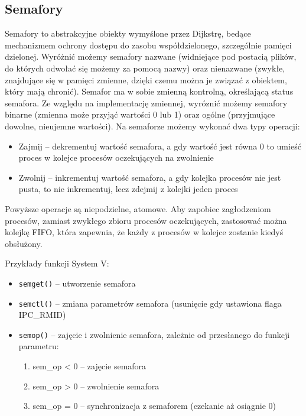 \subsection{Semafory}

Semafory to abstrakcyjne obiekty wymyślone przez Dijkstrę, bedące mechanizmem ochrony dostępu do zasobu współdzielonego, szczególnie pamięci dzielonej. Wyróżnić możemy semafory nazwane (widniejące pod postacią plików, do których odwołać się możemy za pomocą nazwy) oraz nienazwane (zwykłe, znajdujące się w pamięci zmienne, dzięki czemu można je związać z obiektem, który mają chronić). Semafor ma w sobie zmienną kontrolną, określającą status semafora. Ze względu na implementację zmiennej, wyróznić możemy semafory binarne (zmienna może przyjąć wartości 0 lub 1) oraz ogólne (przyjmujące dowolne, nieujemne wartości). Na semaforze możemy wykonać dwa typy operacji:
\begin{itemize}
	\item Zajmij -- dekrementuj wartość semafora, a gdy wartość jest równa 0 to umieść proces w kolejce procesów oczekujących na zwolnienie
    \item Zwolnij -- inkrementuj wartość semafora, a gdy kolejka procesów nie jest pusta, to nie inkrementuj, lecz zdejmij z kolejki jeden proces
\end{itemize}
Powyższe operacje są niepodzielne, atomowe. Aby zapobiec zagłodzeniom procesów, zamiast zwykłego zbioru procesów oczekujących, zastosować można kolejkę FIFO, która zapewnia, że każdy z procesów w kolejce zostanie kiedyś obsłużony.

Przykłady funkcji System V:
\begin{itemize}
	\item \texttt{semget()} -- utworzenie semafora
    \item \texttt{semctl()} -- zmiana parametrów semafora (usunięcie gdy ustawiona flaga IPC\_RMID)
    \item \texttt{semop()} -- zajęcie i zwolnienie semafora, zależnie od przesłanego do funkcji parametru:
	\begin{enumerate}
		\item sem\_op < 0 -- zajęcie semafora
        \item sem\_op > 0 -- zwolnienie semafora
        \item sem\_op = 0 -- synchronizacja z semaforem (czekanie aż osiągnie 0)
	\end{enumerate}
\end{itemize}

